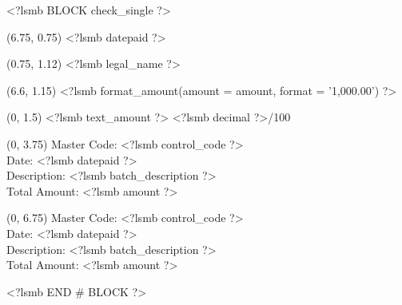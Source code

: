 \usepackage{textpos}

\setlength{\TPHorizModule}{1in}
\setlength{\TPVertModule}{1in}
<?lsmb BLOCK check_single ?>
%
%

\begin{textblock}{2}(6.75, 0.75)
<?lsmb datepaid ?>
\end{textblock}
\begin{textblock}{5.5}(0.75, 1.12)
<?lsmb legal_name ?>
\end{textblock}


\begin{textblock}{2}(6.6, 1.15)
<?lsmb format_amount({amount = amount, format = '1,000.00'}) ?>
\end{textblock}
\begin{textblock}{7.25}(0, 1.5)
<?lsmb text_amount ?> \dotfill <?lsmb decimal ?>/100 \makebox[0.5cm]{\hfill}
\end{textblock}
\vspace{0.5cm}

%
%
%
%
%
%
%
%
%
%
%
%
%


\begin{textblock}{7}(0, 3.75)
\vspace{0.5cm}
\noindent Master Code: <?lsmb control_code ?> \\
Date:  <?lsmb datepaid ?>\\
Description: <?lsmb batch_description ?>\\
Total Amount: <?lsmb amount ?>\\
\end{textblock}

\begin{textblock}{7}(0, 6.75)
\vspace{0.5cm}
\noindent Master Code: <?lsmb control_code ?> \\
Date:  <?lsmb datepaid ?>\\
Description: <?lsmb batch_description ?>\\
Total Amount: <?lsmb amount ?>\\
\end{textblock}

\vfill
<?lsmb END # BLOCK ?>
